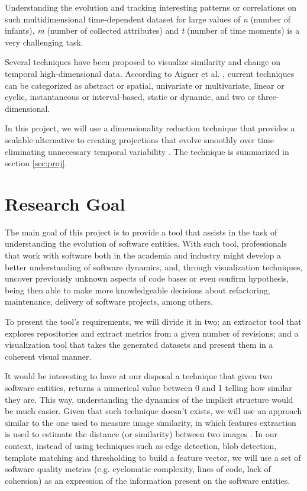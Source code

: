 Understanding the evolution and tracking interesting patterns or correlations on such multidimensional time-dependent dataset for large values of \textit{n} (number of infants), \textit{m} (number of collected attributes) and \textit{t} (number of time moments) is a very challenging task.

Several techniques have been proposed to visualize similarity and change on temporal high-dimensional data. According to Aigner et al. \cite{ref:timedata}, current techniques can be categorized as abstract or spatial, univariate or multivariate, linear or cyclic, instantaneous or interval-based, static or dynamic, and two or three-dimensional.

In this project, we will use a dimensionality reduction technique that provides a scalable alternative to creating projections that evolve smoothly over time eliminating unnecessary temporal variability \cite{ref:dtsne}. The technique is summarized in section \ref{sec:proj}.

\section{Research Goal} \label{research_goal}
The main goal of this project is to provide a tool that assists in the task of understanding the evolution of software entities. With such tool, professionals that work with software both in the academia and industry might develop a better understanding of software dynamics, and, through visualization techniques, uncover previously unknown aspects of code bases or even confirm hypothesis, being then able to make more knowledgeable decisions about refactoring, maintenance, delivery of software projects, among others.

To present the tool's requirements, we will divide it in two: an extractor tool that explores repositories and extract metrics from a given number of revisions; and a visualization tool that takes the generated datasets and present them in a coherent visual manner.

It would be interesting to have at our disposal a technique that given two software entities, returns a numerical value between 0 and 1 telling how similar they are. This way, understanding the dynamics of the implicit structure would be much easier. Given that such technique doesn't exists, we will use an approach similar to the one used to measure image similarity, in which features extraction is used to estimate the distance (or similarity) between two images  \cite{ref:imagefeatures}. In our context, instead of using techniques such as edge detection, blob detection, template matching and thresholding to build a feature vector, we will use a set of software quality metrics (e.g. cyclomatic complexity, lines of code, lack of cohersion) as an expression of the information present on the software entities.

